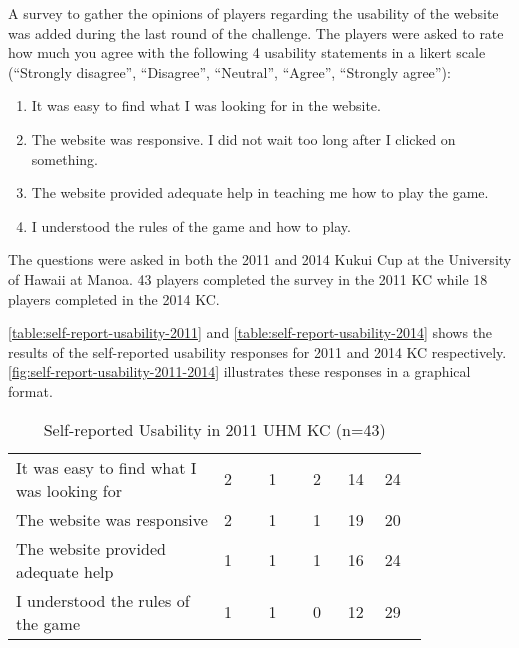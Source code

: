 A survey to gather the opinions of players regarding the usability of the website was added during the last round of the challenge. The players were asked to rate how much you agree with the following 4 usability statements in a likert scale (``Strongly disagree'', ``Disagree'', ``Neutral'', ``Agree'', ``Strongly agree''):
\begin{enumerate}
\item It was easy to find what I was looking for in the website.
\item The website was responsive. I did not wait too long after I clicked on something.
\item The website provided adequate help in teaching me how to play the game.
\item I understood the rules of the game and how to play.
\end{enumerate}

The questions were asked in both the 2011 and 2014 Kukui Cup at the University of Hawaii at Manoa. 43 players completed the survey in the 2011 KC while 18 players completed in the 2014 KC.  

\autoref{table:self-report-usability-2011}  and \autoref{table:self-report-usability-2014}  shows the results of the self-reported usability responses for 2011 and 2014 KC respectively. \autoref{fig:self-report-usability-2011-2014} illustrates these responses in a graphical format.

\begin{table}[ht!]
  \centering
  \begin{tabular} {|P{0.42\linewidth}|P{0.09\linewidth}|p{0.09\linewidth}|p{0.075\linewidth}|p{0.06\linewidth}|P{0.09\linewidth}|}
    \hline
    \centering {} &  &  &  &  & \\
    \hline
It was easy to find what I was looking for & 2 & 1 & 2 & 14 & 24 \\
    \hline
The website was responsive & 2 & 1 & 1& 19 & 20 \\
    \hline
The website provided adequate help & 1 & 1 & 1 & 16 & 24\\
    \hline
I understood the rules of the game & 1& 1 & 0 & 12 & 29\\
    \hline 
  \end{tabular}
  \caption{Self-reported Usability in 2011 UHM KC (n=43)}
  \label{table:self-report-usability-2011}
\end{table}

